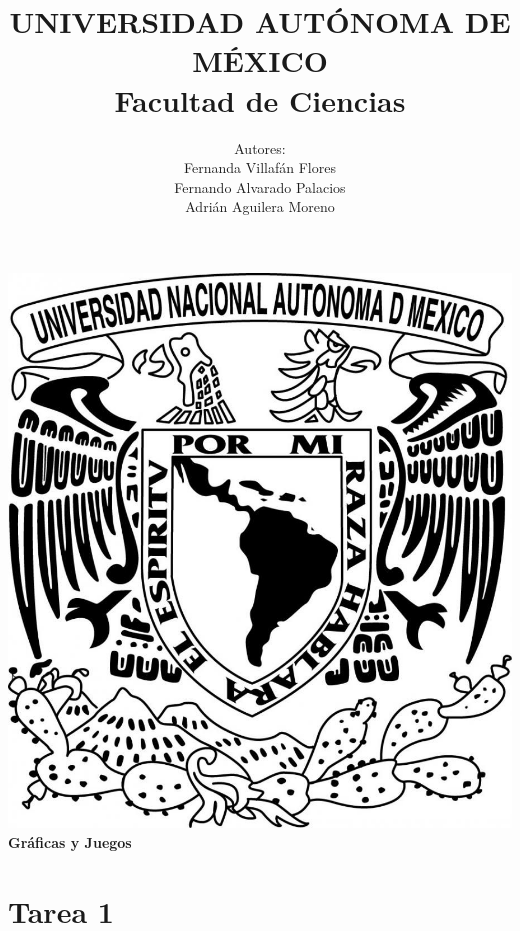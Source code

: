 \documentclass{article}
\begin{document}
\title{UNIVERSIDAD AUT\'ONOMA DE M\'EXICO\\ Facultad de Ciencias}
\author{Autores:
  \\ Fernanda Villaf\'an Flores
  \\ Fernando Alvarado Palacios
  \\ Adri\'an Aguilera Moreno}
\date{}
\maketitle
\begin{center}
  \includegraphics[scale=0.20]{../Imagen/Portada.jpg}\\[0.4cm]
  \Large
  \bf{Gr\'aficas y Juegos}
  \normalsize
\end{center}
\newpage
{}
\section*{\LARGE{Tarea 1}}
\end{document}
